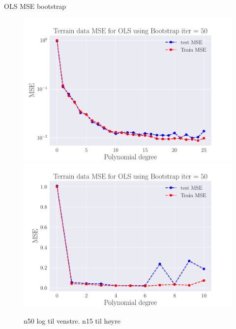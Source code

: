 \documentclass[reprint,english,notitlepage,aps,nobalancelastpage,nofootinbib]{revtex4-1}  %
\begin{document}
OLS MSE bootstrap
\begin{figure}[H]
	\includegraphics[width=\linewidth]{SRTM_MSE_OLS_n50_pol25_Bootstrap_re50_log.pdf}
	\endminipage\hfill
	\includegraphics[width=\linewidth]{SRTM_MSE_OLS_n15_pol10_Bootstrap_re50.pdf}
	\endminipage
	\caption{n50 log til venstre. n15 til høyre}
  \label{fig:terrain_OLS_MSE_bootstrap}
\end{figure}
\end{document}
